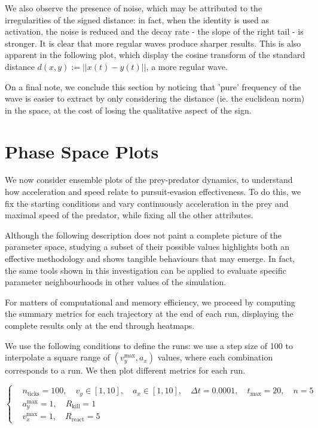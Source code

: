 \documentclass[11pt]{article}
\begin{document}
            We also observe the presence of noise, which may be attributed to the irregularities of the signed distance: in fact, when the identity is used as activation, the noise is reduced and the decay rate - the slope of the right tail - is stronger. It is clear that more regular waves produce sharper results. This is also apparent in the following plot, which display the cosine transform of the standard distance $d(x,y) := ||x(t)-y(t)||$, a more regular wave.

            On a final note, we conclude this section by noticing that 'pure' frequency of the wave is easier to extract by only considering the distance (ie. the euclidean norm) in the space, at the cost of losing the qualitative aspect of the sign.

            \section{Phase Space Plots}
            We now consider ensemble plots of the prey-predator dynamics, to understand how acceleration and speed relate to pursuit-evasion effectiveness. To do this, we fix the starting conditions and vary continuously acceleration in the prey and maximal speed of the predator, while fixing all the other attributes.

            Although the following description does not paint a complete picture of the parameter space, studying a subset of their possible values highlights both an effective methodology and shows tangible behaviours that may emerge. In fact, the same tools shown in this investigation can be applied to evaluate specific parameter neighbourhoods in other values of the simulation.

            For matters of computational and memory efficiency, we proceed by computing the summary metrics for each trajectory at the end of each run, displaying the complete results only at the end through heatmaps.

            We use the following conditions to define the runs: we use a step size of 100 to interpolate a square range of $(v^\text{max}_y, a_x)$ values, where each combination corresponds to a run. We then plot different metrics for each run.

            \[
              \left\{
                \begin{aligned}
                  &n_{\text{ticks}} = 100,\quad v_y \in [1, 10],\quad a_x \in [1, 10],\quad \Delta t = 0.0001,\quad t_{\text{max}} = 20,\quad n = 5 \\
                  &a^{\text{max}}_y = 1,\quad R_{\text{kill}} = 1 \\
                  &v^{\text{max}}_x = 1,\quad R_{\text{react}} = 5
                \end{aligned}
                \right.
              \]
\end{document}
